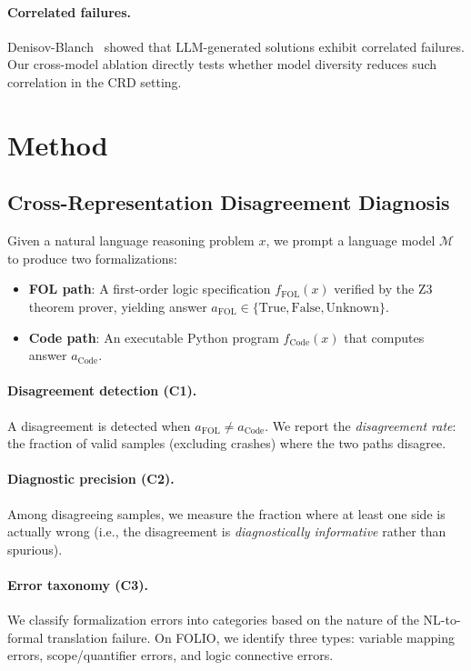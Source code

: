\documentclass[11pt,a4paper]{article}
\begin{document}
\paragraph{Correlated failures.}
Denisov-Blanch~\cite{denisov2026correlated} showed that LLM-generated solutions exhibit correlated failures. Our cross-model ablation directly tests whether model diversity reduces such correlation in the CRD setting.

\section{Method}

\subsection{Cross-Representation Disagreement Diagnosis}

Given a natural language reasoning problem $x$, we prompt a language model $\mathcal{M}$ to produce two formalizations:
\begin{itemize}
    \item \textbf{FOL path}: A first-order logic specification $f_\text{FOL}(x)$ verified by the Z3 theorem prover, yielding answer $a_\text{FOL} \in \{\text{True}, \text{False}, \text{Unknown}\}$.
    \item \textbf{Code path}: An executable Python program $f_\text{Code}(x)$ that computes answer $a_\text{Code}$.
\end{itemize}

\paragraph{Disagreement detection (C1).}
A disagreement is detected when $a_\text{FOL} \neq a_\text{Code}$. We report the \textit{disagreement rate}: the fraction of valid samples (excluding crashes) where the two paths disagree.

\paragraph{Diagnostic precision (C2).}
Among disagreeing samples, we measure the fraction where at least one side is actually wrong (i.e., the disagreement is \textit{diagnostically informative} rather than spurious).

\paragraph{Error taxonomy (C3).}
We classify formalization errors into categories based on the nature of the NL-to-formal translation failure. On FOLIO, we identify three types: variable mapping errors, scope/quantifier errors, and logic connective errors.
\end{document}
